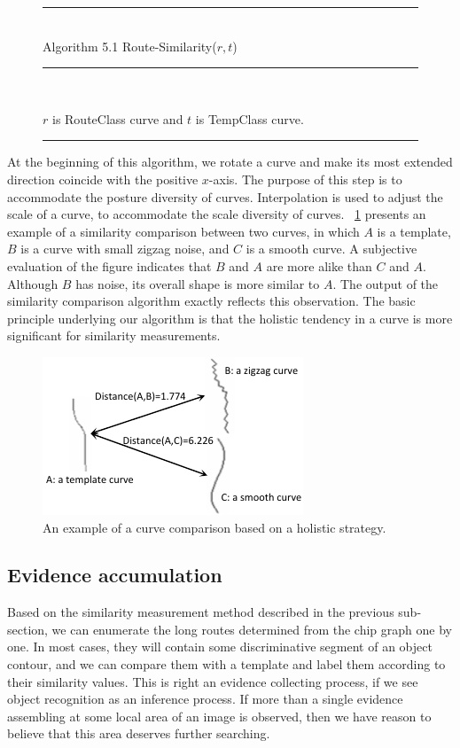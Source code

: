 \documentclass[journal]{IEEEtran}
\newenvironment{myalgorithm}[1]%
{\begin{figure}[!h]\small\noindent\rule{\linewidth}{1pt}\\#1\vspace{-0.5em}\\%
\rule{\linewidth}{0.5pt}\\\vspace{-1.5em}}%
{\vspace{-0.5em}\rule{\linewidth}{1pt}\end{figure}}
\begin{document}
\begin{myalgorithm}{Algorithm 5.1 Route-Similarity($r,t$)}
\begin{algorithmic}[1]
\REQUIRE $r$ is RouteClass curve and $t$ is TempClass curve.
\end{algorithmic}
\end{myalgorithm}

At the beginning of this algorithm, we rotate a curve and make its most extended direction coincide with the positive $x$-axis. 
The purpose of this step is to accommodate the posture diversity of curves. 
Interpolation is used to adjust the scale of a curve, to accommodate the scale diversity of curves. 
\figurename~\ref{fig:13} presents an example of a similarity comparison between two curves,
in which $A$ is a template, $B$ is a curve with small zigzag noise, and $C$ is a smooth curve. 
A subjective evaluation of the figure indicates that $B$ and $A$ are more alike than $C$ and $A$. 
Although $B$ has noise, its overall shape is more similar to $A$. 
The output of the similarity comparison algorithm exactly reflects this observation. 
The basic principle underlying our algorithm is that the holistic tendency in a curve is more significant for similarity measurements. 

\begin{figure}[!t]
\centering
\includegraphics[width=0.65\linewidth]{images/fig13.pdf}
\caption{An example of a curve comparison based on a holistic strategy.}
\label{fig:13}
\end{figure}

\subsection{Evidence accumulation}

Based on the similarity measurement method described in the previous sub-section, 
we can enumerate the long routes determined from the chip graph one by one. 
In most cases, they will contain some discriminative segment of an object contour, 
and we can compare them with a template and label them according to their similarity values. 
This is right an evidence collecting process, 
if we see object recognition as an inference process. 
If more than a single evidence assembling at some local area of an image is observed, 
then we have reason to believe that this area deserves further searching.
\end{document}
